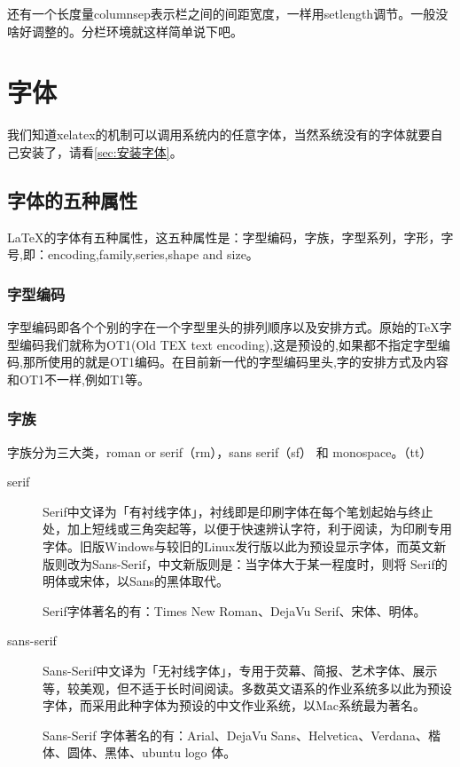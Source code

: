 \documentclass[11pt,oneside]{book}
\begin{document}
\begin{common-format}
\begin{multicols}{2}
还有一个长度量columnsep表示栏之间的间距宽度，一样用setlength调节。一般没啥好调整的。分栏环境就这样简单说下吧。
\end{multicols}


\section{字体}
我们知道xelatex的机制可以调用系统内的任意字体，当然系统没有的字体就要自己安装了，请看\ref{sec:安装字体}。

\subsection{字体的五种属性}
\LaTeX 的字体有五种属性，这五种属性是：字型编码，字族，字型系列，字形，字号,即：encoding,family,series,shape and size。

\subsubsection{字型编码}
字型编码即各个个别的字在一个字型里头的排列顺序以及安排方式。原始的\TeX 字型编码我们就称为OT1(Old TEX text encoding),这是预设的,如果都不指定字型编码,那所使用的就是OT1编码。在目前新一代的字型编码里头,字的安排方式及内容和OT1不一样,例如T1等。


\subsubsection{字族}
字族分为三大类，roman or serif（rm），sans serif（sf） 和 monospace。（tt）


\begin{description}
\item[serif] Serif中文译为「有衬线字体」，衬线即是印刷字体在每个笔划起始与终止处，加上短线或三角突起等，以便于快速辨认字符，利于阅读，为印刷专用字体。旧版Windows与较旧的Linux发行版以此为预设显示字体，而英文新版则改为Sans-Serif，中文新版则是：当字体大于某一程度时，则将 Serif的明体或宋体，以Sans的黑体取代。

Serif字体著名的有：Times New Roman、DejaVu Serif、宋体、明体。

\item[sans-serif] Sans-Serif中文译为「无衬线字体」，专用于荧幕、简报、艺术字体、展示等，较美观，但不适于长时间阅读。多数英文语系的作业系统多以此为预设字体，而采用此种字体为预设的中文作业系统，以Mac系统最为著名。

Sans-Serif 字体著名的有：Arial、DejaVu Sans、Helvetica、\linebreak Verdana、楷体、圆体、黑体、ubuntu logo 体。


\end{description}
\end{common-format}
\end{document}
